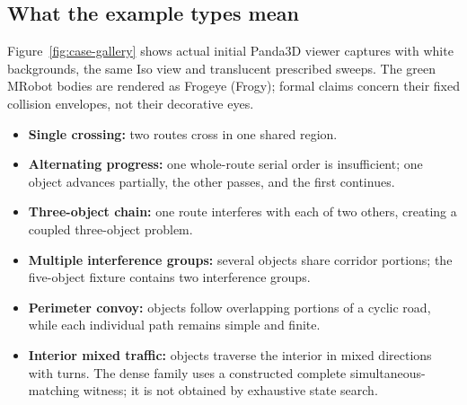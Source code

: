 \documentclass[11pt,a4paper]{article}
\theoremstyle{remark}
\begin{document}
\subsection{What the example types mean}
Figure~\ref{fig:case-gallery} shows actual initial Panda3D viewer captures
with white backgrounds, the same Iso view and translucent prescribed
sweeps. The green MRobot bodies are rendered as Frogeye (Frogy); formal
claims concern their fixed collision envelopes, not their decorative eyes.
\begin{itemize}
\item \textbf{Single crossing:} two routes cross in one shared region.
\item \textbf{Alternating progress:} one whole-route serial order is
insufficient; one object advances partially, the other passes, and the first continues.
\item \textbf{Three-object chain:} one route interferes with each of two
others, creating a coupled three-object problem.
\item \textbf{Multiple interference groups:} several objects share corridor
portions; the five-object fixture contains two interference groups.
\item \textbf{Perimeter convoy:} objects follow overlapping portions of a
cyclic road, while each individual path remains simple and finite.
\item \textbf{Interior mixed traffic:} objects traverse the interior in
mixed directions with turns. The dense family uses a constructed complete
simultaneous-matching witness; it is not obtained by exhaustive state search.
\end{itemize}
\end{document}
